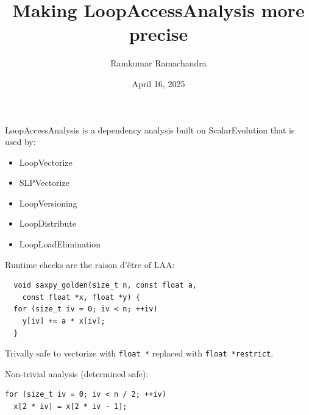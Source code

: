 \documentclass{beamer}
\title{Making LoopAccessAnalysis more precise}
\author{Ramkumar Ramachandra}
\institute{Codasip}
\date{April 16, 2025}
\begin{document}
\begin{frame}
  \titlepage
\end{frame}
\begin{frame}
  LoopAccessAnalysis is a dependency analysis built on ScalarEvolution that is used by:
  \begin{itemize}
    \item LoopVectorize
    \item SLPVectorize
    \item LoopVersioning
    \item LoopDistribute
    \item LoopLoadElimination
  \end{itemize}
\end{frame}

\begin{frame}[containsverbatim]
  Runtime checks are the raison d'être of LAA:
  \begin{verbatim}
  void saxpy_golden(size_t n, const float a,
    const float *x, float *y) {
  for (size_t iv = 0; iv < n; ++iv)
    y[iv] += a * x[iv];
  }
  \end{verbatim}

  \vspace{1em}

  Trivally safe to vectorize with \texttt{float *} replaced with \texttt{float *restrict}.

  \vspace{1em}

  Non-trivial analysis (determined safe):
  \begin{verbatim}
for (size_t iv = 0; iv < n / 2; ++iv)
  x[2 * iv] = x[2 * iv - 1];
  \end{verbatim}
\end{frame}
\end{document}
